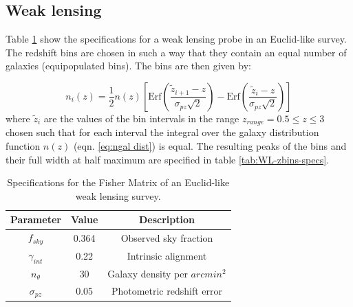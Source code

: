\subsection{Weak lensing}

Table \ref{tab:WL-specifications-1} show the specifications for a
weak lensing probe in an Euclid-like survey. The redshift bins are
chosen in such a way that they contain an equal number of galaxies
(equipopulated bins). The bins are then given by:

\begin{equation}
n_{i}(z)=\frac{1}{2}n(z)\left[\mbox{Erf}\left(\frac{\tilde{z}_{i+1}-z}{\sigma_{pz}\sqrt{2}}\right)-\mbox{Erf}\left(\frac{\tilde{z}_{i}-z}{\sigma_{pz}\sqrt{2}}\right)\right]
\end{equation}
where $\tilde{z}_{i}$ are the values of the bin intervals in the
range $z_{range}=0.5\leq z\leq3$ chosen such that for each interval
the integral over the galaxy distribution function $n(z)$ (eqn. \ref{eq:ngal dist})
is equal. The resulting peaks of the bins and their full width at
half maximum are specified in table \ref{tab:WL-zbins-specs}.

\begin{table}
\centering{}%
\begin{tabular}{|c|c|c|}
\hline 
\textbf{Parameter}  & \textbf{Value}  & \textbf{Description}\tabularnewline
\hline 
$f_{sky}$  & 0.364  & Observed sky fraction\tabularnewline
$\gamma_{int}$  & 0.22  & Intrinsic alignment\tabularnewline
$n_{\theta}$  & 30  & Galaxy density per $arcmin^{2}$\tabularnewline
$\sigma_{pz}$  & 0.05  & Photometric redshift error\tabularnewline
\hline 
\end{tabular}
\caption[Specifications for a Euclid WL Fisher forecast]{\label{tab:WL-specifications-1} Specifications for the Fisher Matrix
of an Euclid-like weak lensing survey.}
\end{table}


